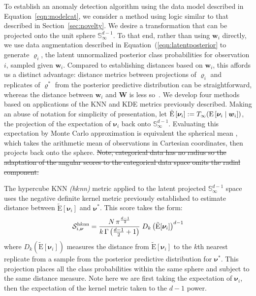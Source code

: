To establish an anomaly detection algorithm using the data model described in 
    Equation~\ref{eqn:modelcat}, we consider a method using logic similar to 
    that described in Section~\ref{sec:novelty}.  We desire a transformation that 
    can be projected onto the unit sphere $\mathbb{S}_{\infty}^{d-1}$.  To that 
    end, rather than using $\bm{w}_i$ directly, we use data augmentation
    described in Equation~(\ref{eqn:latentposterior} to generate $\bm{\varrho}_i$, 
    the latent unnormalized posterior class probabilities for observation $i$, 
    sampled given $\bm{w}_i$.  Compared to 
    establishing distances based on $\bm{w}_i$, this affords us a distinct 
    advantage: distance metrics between projections of $\bm{\varrho}_i$ and 
    replicates of $\bm{\varrho}^*$ from the posterior predictive distribution 
    can be straightforward, whereas the distance between $\bm{w}_i$ 
    and $\bm{W}$ is less so~\citep{Alamuri2014}. We develop four methods based
    on applications of the KNN and KDE metrics previously described.
    Making an abuse of notation for simplicity of presentation, let 
    $\tilde{\text{E}}\left[\bm{\nu}_i\right] := T_{\infty}(\text{E}\left[\bm{\nu}_i\mid\bm{w}_i\right])$, 
    the projection of the expectation of $\bm{\nu}_i$ back onto 
    $\mathbb{S}_{\infty}^{d-1}$.  Evaluating this expectation by
    Monte Carlo approximation is equivalent the spherical mean 
    \citep{mardia1999}, which takes the arithmetic mean of observations in 
    Cartesian coordinates, then projects back onto the sphere. \st{Note, 
    categorical data has no radius so the adaptation of the angular scores to 
    the categorical data space omits the radial component.}

The hypercube KNN \emph{(h$k$nn)} metric applied to the latent projected 
    $\mathbb{S}_{\infty}^{d-1}$ space uses the negative definite kernel metric 
    previously established to estimate distance between $\tilde{\text{E}}[\bm{\nu}_i]$
    and $\bm{\nu}^*$.  This score takes the form:
    \begin{equation}
      \label{score:cat_hknn}
      \mathcal{S}_{i,\bm{\nu}}^{\text{h$k$nn}} = \frac{N\,\pi^{\frac{d-1}{2}}}{k\,\Gamma\left(\frac{d-1}{2} + 1\right)}
        \;D_{k}\left(\tilde{\text{E}}[\bm{\nu}_i]\right)^{d-1}
    \end{equation}
    where $D_{k}\left(\tilde{\text{E}}[\bm{\nu}_i]\right)$ measures the 
    distance from $\tilde{\text{E}}[\bm{\nu}_i]$ to the $k$th nearest replicate from 
    a sample from the posterior predictive distribution for $\bm{\nu}^*$.  This 
    projection places all the class probabilities within the same sphere and 
    subject to the same distance measure.  Note here we are first taking the 
    expectation of $\bm{\nu}_i$, then the expectation of the kernel metric taken 
    to the $d-1$ power.

